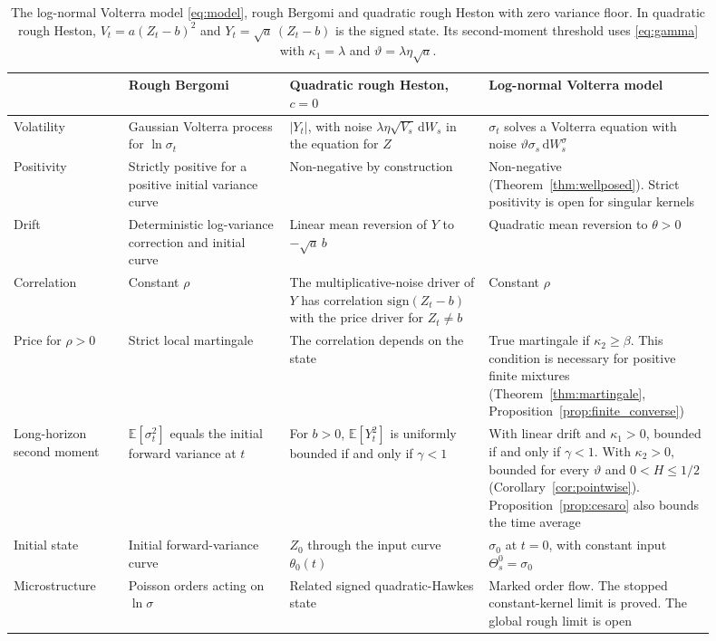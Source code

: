 \documentclass[11pt,a4paper]{article}
\theoremstyle{definition}
\newcommand{\D}{\mathrm{d}}
\newcommand{\E}{\mathbb{E}}
\begin{document}
\begin{table}[ht]
\centering
\small
\caption{The log-normal Volterra model \eqref{eq:model}, rough Bergomi and quadratic rough Heston with zero variance floor. In quadratic rough Heston, $V_t=a(Z_t-b)^2$ and $Y_t=\sqrt a\,(Z_t-b)$ is the signed state. Its second-moment threshold uses \eqref{eq:gamma} with $\kappa_1=\lambda$ and $\vartheta=\lambda\eta\sqrt a$.}\label{tab:rbergomi}
\begin{tabular}{@{}>{\raggedright\arraybackslash}p{0.15\linewidth}>{\raggedright\arraybackslash}p{0.21\linewidth}>{\raggedright\arraybackslash}p{0.26\linewidth}>{\raggedright\arraybackslash}p{0.28\linewidth}@{}}
\toprule
 & Rough Bergomi & Quadratic rough Heston, $c=0$ & Log-normal Volterra model \\
\midrule
Volatility & Gaussian Volterra process for $\ln\sigma_t$ & $|Y_t|$, with noise $\lambda\eta\sqrt{V_s}\,\D W_s$ in the equation for $Z$ & $\sigma_t$ solves a Volterra equation with noise $\vartheta\sigma_s\,\D W^\sigma_s$ \\
\addlinespace[2pt]
Positivity & Strictly positive for a positive initial variance curve & Non-negative by construction & Non-negative (Theorem~\ref{thm:wellposed}). Strict positivity is open for singular kernels \\
\addlinespace[2pt]
Drift & Deterministic log-variance correction and initial curve & Linear mean reversion of $Y$ to $-\sqrt a\,b$ & Quadratic mean reversion to $\theta>0$ \\
\addlinespace[2pt]
Correlation & Constant $\rho$ & The multiplicative-noise driver of $Y$ has correlation $\mathrm{sign}(Z_t-b)$ with the price driver for $Z_t\ne b$ & Constant $\rho$ \\
\addlinespace[2pt]
Price for $\rho>0$ & Strict local martingale \citep{Gassiat2019} & The correlation depends on the state & True martingale if $\kappa_2\ge\beta$. This condition is necessary for positive finite mixtures (Theorem~\ref{thm:martingale}, Proposition~\ref{prop:finite_converse}) \\
\addlinespace[2pt]
Long-horizon second moment & $\E[\sigma_t^2]$ equals the initial forward variance at $t$ & For $b>0$, $\E[Y_t^2]$ is uniformly bounded if and only if $\gamma<1$ & With linear drift and $\kappa_1>0$, bounded if and only if $\gamma<1$. With $\kappa_2>0$, bounded for every $\vartheta$ and $0<H\le1/2$ (Corollary~\ref{cor:pointwise}). Proposition~\ref{prop:cesaro} also bounds the time average \\
\addlinespace[2pt]
Initial state & Initial forward-variance curve & $Z_0$ through the input curve $\theta_0(t)$ & $\sigma_0$ at $t=0$, with constant input $\Theta_s^0=\sigma_0$ \\
\addlinespace[2pt]
Microstructure & Poisson orders acting on $\ln\sigma$ \citep{HagerHorstWagenhoferXu2026} & Related signed quadratic-Hawkes state \citep{DandapaniJusselinRosenbaum2021} & Marked order flow. The stopped constant-kernel limit is proved. The global rough limit is open \\
\bottomrule
\end{tabular}
\end{table}
\end{document}
